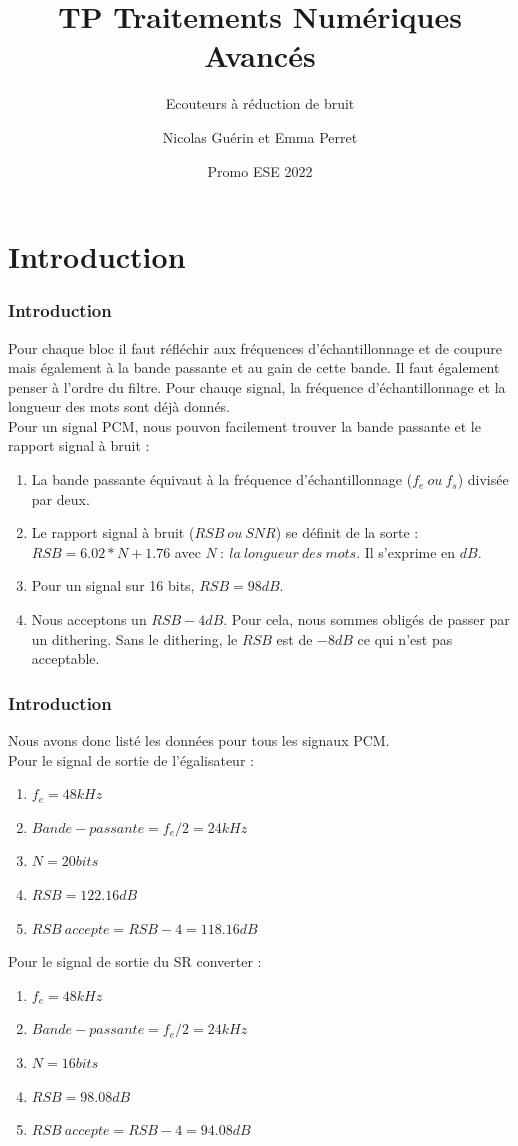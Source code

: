 \documentclass[
10pt,
aspectratio=169,
]{beamer}
\title{TP Traitements Numériques Avancés}
\subtitle{Ecouteurs à réduction de bruit}
\date{Promo ESE 2022}
\author{Nicolas Guérin et Emma Perret}
\begin{document}
\begin{frame}
\titlepage
\end{frame}

\section{Introduction}
\begin{frame} 
\frametitle{Introduction} 
Pour chaque bloc il faut réfléchir aux fréquences d'échantillonnage et de coupure mais également à la bande passante et au gain de cette bande. Il faut également penser à l'ordre du filtre. Pour chauqe signal, la fréquence d'échantillonnage et la longueur des mots sont déjà donnés.\\
Pour un signal PCM, nous pouvon facilement trouver la bande passante et le rapport signal à bruit :
\begin{enumerate} 
\item La bande passante équivaut à la fréquence d'échantillonnage ($f_e ~ ou ~ f_s$) divisée par deux.
\item Le rapport signal à bruit ($RSB ~ ou ~ SNR$) se définit de la sorte : $RSB = 6.02 * N + 1.76 $ avec $N ~ : ~ la ~ longueur ~ des ~ mots$. Il s'exprime en $dB$.
\item Pour un signal sur 16 bits, $RSB = 98 dB$.
\item Nous acceptons un $RSB - 4dB$. Pour cela, nous sommes obligés de passer par un dithering. Sans le dithering, le $RSB$ est de $-8 dB$ ce qui n'est pas acceptable.
\end{enumerate}
\end{frame}

\begin{frame} 
\frametitle{Introduction} 
Nous avons donc listé les données pour tous les signaux PCM.\\
Pour le signal de sortie de l'égalisateur : 
\begin{enumerate} 
\item $f_e = 48 kHz$
\item $Bande-passante = f_e/2 = 24 kHz$
\item $N = 20 bits$
\item $RSB = 122.16 dB$
\item $RSB ~accepte = RSB - 4 = 118.16 dB$
\end{enumerate}
\vspace*{0.7cm}
Pour le signal de sortie du SR converter : 
\begin{enumerate} 
\item $f_e = 48 kHz$
\item $Bande-passante = f_e/2 = 24 kHz$
\item $N = 16 bits$
\item $RSB = 98.08 dB$
\item $RSB ~accepte = RSB - 4 = 94.08 dB$
\end{enumerate}
\end{frame}
\end{document}
